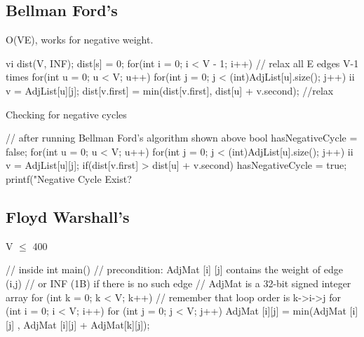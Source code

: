 \documentclass{article}
\begin{document}
\subsection{Bellman Ford's}
O(VE), works for negative weight.
\begin{mylisting}{}
vi dist(V, INF); dist[s] = 0;
for(int i = 0; i < V - 1; i++){		// relax all E edges V-1 times
	for(int u = 0; u < V; u++){
		for(int j = 0; j < (int)AdjList[u].size(); j++){
			ii v = AdjList[u][j];
			dist[v.first] = min(dist[v.first], dist[u] + v.second);	
		} //relax
	}
}
\end{mylisting}
\pagebreak
Checking for negative cycles
\begin{mylisting}{}
// after running Bellman Ford's algorithm shown above
bool hasNegativeCycle = false;
for(int u = 0; u < V; u++){
	for(int j = 0; j < (int)AdjList[u].size(); j++){
		ii v = AdjList[u][j];
		if(dist[v.first] > dist[u] + v.second)
			hasNegativeCycle = true;	
	}
}
printf("Negative Cycle Exist? %
\end{mylisting}

\subsection{Floyd Warshall's}
V $\leq$ 400
\begin{mylisting}{}
// inside int main()
// precondition: AdjMat [i] [j] contains the weight of edge (i,j)  
// or INF (1B) if there is no such edge
// AdjMat is a 32-bit signed integer array
for (int k = 0; k < V; k++) // remember that loop order is k->i->j
	for (int i = 0; i < V; i++)
		for (int j = 0; j < V; j++)
			AdjMat [i][j] = min(AdjMat [i][j] , AdjMat [i][j] + AdjMat[k][j]);
\end{mylisting}
\end{document}
